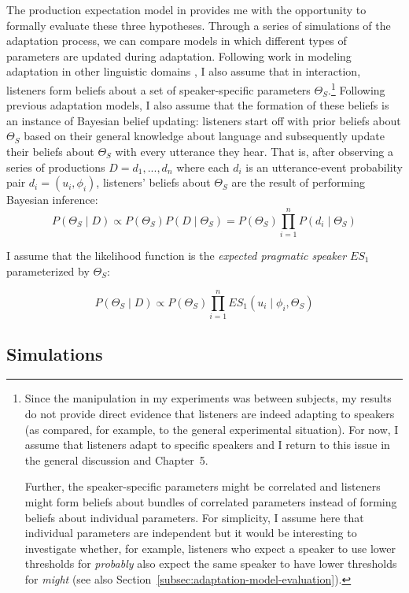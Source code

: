 The production expectation model in  provides me with the opportunity to formally evaluate these three hypotheses.
Through a series of simulations of the adaptation process, we can compare models in which different types of parameters are
 updated during adaptation. Following work in modeling adaptation in other linguistic domains , 
I also assume that in interaction, listeners form beliefs about a set of speaker-specific parameters $\Theta_S$.\footnote{Since the manipulation in my experiments was between subjects, my results do not provide direct evidence that listeners are indeed adapting to speakers (as compared, for example, to the general experimental situation). For now, I assume that listeners adapt to specific speakers and I return to this issue in the general discussion and Chapter~5.

Further, the speaker-specific parameters might be correlated and  listeners might form beliefs about bundles of correlated parameters instead of forming beliefs about individual parameters. For simplicity, I assume here that individual parameters are independent but it would be interesting to investigate whether, for example, listeners who expect a speaker to use lower thresholds for \textit{probably} also expect the same speaker to have lower thresholds for \textit{might} (see also Section~\ref{subsec:adaptation-model-evaluation}).}
Following previous adaptation models, I also assume that the formation of these beliefs is an instance of Bayesian belief updating:
listeners start off with prior beliefs about $\Theta_S$ based on their general knowledge about 
language and subsequently update their beliefs about $\Theta_S$ with every utterance they hear. 
That is, after observing a series of productions $D={d_1, ..., d_n}$ where each $d_i$ is an 
utterance-event probability pair $d_i = (u_i, \phi_i)$, listeners' beliefs about $\Theta_S$ are the result
of performing Bayesian inference:
$$P(\Theta_S \mid D) \propto P(\Theta_S) P(D \mid \Theta_S) = P(\Theta_S) \prod_{i=1}^nP(d_i \mid \Theta_S) $$

\noindent I assume that the likelihood function is the \textit{expected pragmatic speaker} $ES_1$ parameterized by $\Theta_S$:

$$P(\Theta_S \mid D) \propto P(\Theta_S)  \prod_{i=1}^n ES_1(u_i \mid \phi_i, \Theta_S) $$



\subsection{Simulations}

